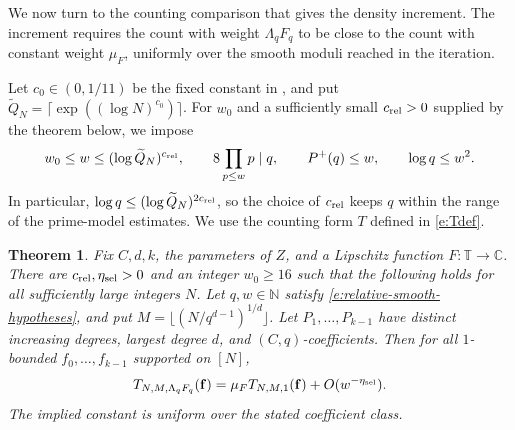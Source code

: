 \documentclass[12pt]{amsart}
\newcommand{\1}{\mathbf 1}
\newtheorem{theorem}{Theorem}[section]
\theoremstyle{definition}
\begin{document}

We now turn to the counting comparison that gives the density
increment. The increment requires the count with weight
\(\Lambda_qF_q\) to be close to the count with constant weight
\(\mu_F\), uniformly over the smooth moduli reached in the iteration.

Let \(c_0\in(0,1/11)\) be the fixed constant in
\cite[Definition~2.3]{KMTT}, and put
\(\widetilde Q_N=\lceil\exp((\log N)^{c_0})\rceil\).
For \(w_0\) and a sufficiently small \(c_{\rm rel}>0\) supplied by
the theorem below, we impose
\begin{equation}\label{e:relative-smooth-hypotheses}
 w_0\le w\le(\log\widetilde Q_N)^{c_{\rm rel}},\qquad
 8\prod_{p\le w}p\mid q,\qquad P^+(q)\le w,\qquad \log q\le w^2.
\end{equation}
In particular, \(\log q\le(\log\widetilde Q_N)^{2c_{\rm rel}}\), so
the choice of \(c_{\rm rel}\) keeps \(q\) within the range of the
prime-model estimates.
We use the counting form $T$ defined in \eqref{e:Tdef}.

\begin{theorem}\label{t:relative-selector-comparison}
Fix $C,d,k$, the parameters of $Z$, and a Lipschitz function
$F:\mathbb T\to\mathbb C$. There are $c_{\rm rel},\eta_{\rm sel}>0$
and an integer $w_0\geq16$ such that the following holds for all
sufficiently large integers $N$. Let $q,w\in\mathbb N$ satisfy
\eqref{e:relative-smooth-hypotheses}, and put
$M=\lfloor(N/q^{d-1})^{1/d}\rfloor$. Let $P_1,\ldots,P_{k-1}$
have distinct increasing degrees, largest degree $d$, and
$(C,q)$-coefficients. Then for all $1$-bounded
$f_0,\ldots,f_{k-1}$ supported on $[N]$,
\begin{equation}\label{e:relative-selector-constant}
 T_{N,M,\Lambda_q F_q}(\mathbf f)
 =\mu_F T_{N,M,1}(\mathbf f)+O(w^{-\eta_{\rm sel}}).
\end{equation}
The implied constant is uniform over the stated coefficient class.
\end{theorem}
\end{document}

